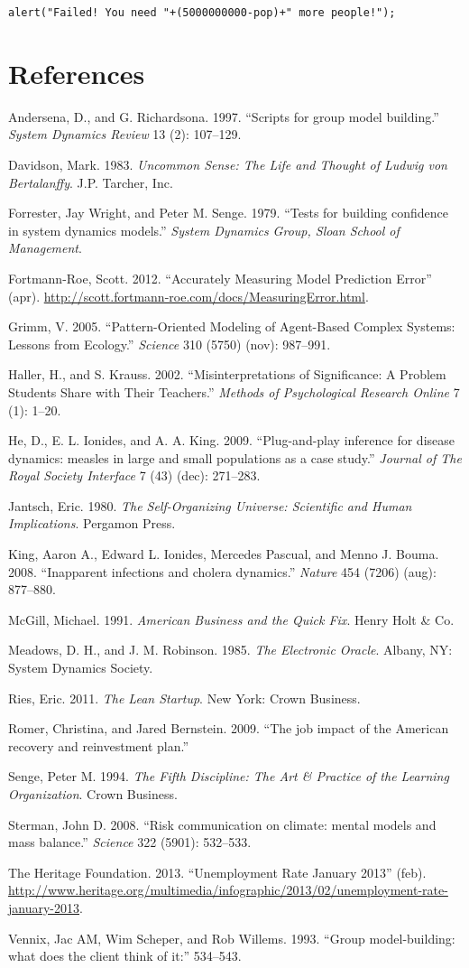 \documentclass[]{memoir}
\begin{document}
\begin{lstlisting}
alert("Failed! You need "+(5000000000-pop)+" more people!");
\end{lstlisting}

\chapter{References}

Andersena, D., and G. Richardsona. 1997. ``Scripts for group model
building.'' \emph{System Dynamics Review} 13 (2): 107--129.

Davidson, Mark. 1983. \emph{Uncommon Sense: The Life and Thought of
Ludwig von Bertalanffy}. J.P. Tarcher, Inc.

Forrester, Jay Wright, and Peter M. Senge. 1979. ``Tests for building
confidence in system dynamics models.'' \emph{System Dynamics Group,
Sloan School of Management}.

Fortmann-Roe, Scott. 2012. ``Accurately Measuring Model Prediction
Error'' (apr).
\url{http://scott.fortmann-roe.com/docs/MeasuringError.html}.

Grimm, V. 2005. ``Pattern-Oriented Modeling of Agent-Based Complex
Systems: Lessons from Ecology.'' \emph{Science} 310 (5750) (nov):
987--991.

Haller, H., and S. Krauss. 2002. ``Misinterpretations of Significance: A
Problem Students Share with Their Teachers.'' \emph{Methods of
Psychological Research Online} 7 (1): 1--20.

He, D., E. L. Ionides, and A. A. King. 2009. ``Plug-and-play inference
for disease dynamics: measles in large and small populations as a case
study.'' \emph{Journal of The Royal Society Interface} 7 (43) (dec):
271--283.

Jantsch, Eric. 1980. \emph{The Self-Organizing Universe: Scientific and
Human Implications}. Pergamon Press.

King, Aaron A., Edward L. Ionides, Mercedes Pascual, and Menno J. Bouma.
2008. ``Inapparent infections and cholera dynamics.'' \emph{Nature} 454
(7206) (aug): 877--880.

McGill, Michael. 1991. \emph{American Business and the Quick Fix}. Henry
Holt \& Co.

Meadows, D. H., and J. M. Robinson. 1985. \emph{The Electronic Oracle}.
Albany, NY: System Dynamics Society.

Ries, Eric. 2011. \emph{The Lean Startup}. New York: Crown Business.

Romer, Christina, and Jared Bernstein. 2009. ``The job impact of the
American recovery and reinvestment plan.''

Senge, Peter M. 1994. \emph{The Fifth Discipline: The Art \& Practice of
the Learning Organization}. Crown Business.

Sterman, John D. 2008. ``Risk communication on climate: mental models
and mass balance.'' \emph{Science} 322 (5901): 532--533.

The Heritage Foundation. 2013. ``Unemployment Rate January 2013'' (feb).
\url{http://www.heritage.org/multimedia/infographic/2013/02/unemployment-rate-january-2013}.

Vennix, Jac AM, Wim Scheper, and Rob Willems. 1993. ``Group
model-building: what does the client think of it:'' 534--543.
\end{document}
